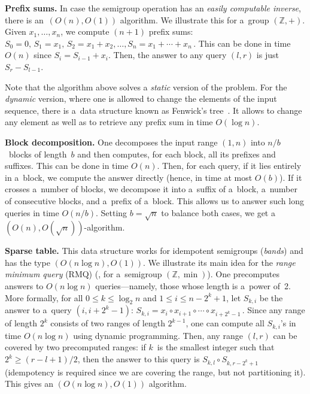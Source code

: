 \documentclass{toc}
\begin{document}
\textbf{Prefix sums.} In case the semigroup operation has an \emph{easily
    computable inverse}, there is an~$(O(n), O(1))$ algorithm. We
illustrate this for a~group $(\mathbb{Z}, +)$. Given $x_1, \dotsc, x_n$, we
compute $(n+1)$ prefix sums:
\(S_0=0,\, S_1=x_1,\, S_2=x_1+x_2, \dotsc, S_n=x_1+\dotsb+x_n\,.\)
This can be done in time $O(n)$ since $S_i=S_{i-1}+x_i$. Then, the answer to any
query $(l,r)$ is just $S_r-S_{l-1}$.

Note that the algorithm above solves a \emph{static} version of the problem. For
the \emph{dynamic} version, where one is allowed to change the elements of the
input sequence, there is a~data structure known as Fenwick's
tree~\cite{DBLP:journals/spe/Fenwick94}. It allows to change any element as well
as to retrieve any prefix sum in time $O(\log n)$.

\textbf{Block decomposition.} One decomposes the input range $(1,n)$ into
$n/b$~blocks of length~$b$ and then computes, for each block, all its prefixes
and suffixes. This can be done in time $O(n)$. Then, for each query, if it lies
entirely in a~block, we compute the answer directly (hence, in time at most
$O(b)$). If it crosses a~number of blocks, we decompose it into a~suffix of
a~block, a~number of consecutive blocks, and a~prefix of a~block. This allows us
to answer such long queries in time $O(n/b)$. Setting $b=\sqrt{n}$ to balance
both cases, we get a~$(O(n), O(\sqrt{n}))$-algorithm.

\textbf{Sparse table.} This data structure works for idempotent semigroups
(\emph{bands}) and has the type $(O(n\log n), O(1))$. We illustrate its main idea
for the \emph{range minimum query} (RMQ)  (\ie, for a~semigroup
$(\mathbb{Z}, \min)$). One precomputes answers to $O(n\log n)$ queries---namely,
those whose length is a~power of~2. More formally, for all $0 \le k \le \log_2n$
and $1 \le i \le n-2^k+1$, let $S_{k,i}$ be the answer to a~query $(i, i+2^k-1)$:
\(S_{k,i}=x_i \circ x_{i+1} \circ \dotsb \circ x_{i+2^k-1} \, .\)
Since any range of length $2^k$ consists of two ranges of length $2^{k-1}$, one
can compute all $S_{k,i}$'s in time $O(n\log n)$ using dynamic programming.
Then, any range $(l,r)$ can be covered by two precomputed ranges: if $k$~is the
smallest integer such that $2^k \ge (r-l+1)/2$, then the answer to this query
is $S_{k,l} \circ S_{k,r-2^k+1}$ (idempotency is required since we are covering
the range, but not partitioning it). This gives an $(O(n\log n), O(1))$
algorithm.
\end{document}
